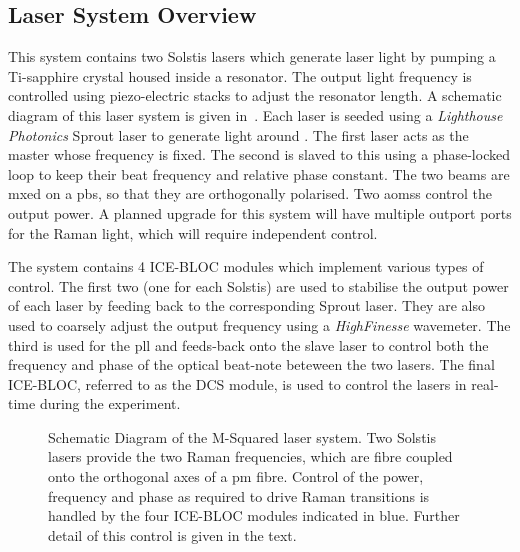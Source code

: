\subsection{Laser System Overview}
\label{subsec:msquared_overview} This system contains two Solstis lasers which
generate laser light by pumping a Ti-sapphire crystal housed inside a resonator.
The output light frequency is controlled using piezo-electric stacks to adjust
the resonator length. A schematic diagram of this laser system is given
in~. Each laser is seeded using a
\textit{Lighthouse Photonics} Sprout laser to generate light around
. The first laser acts as the master whose frequency
is fixed. The second is slaved to this using a phase-locked loop to keep their
beat frequency and relative phase constant. The two beams are mxed on a
\ac{pbs}, so that they are orthogonally polarised. Two \acp{aoms} control the
output power. A planned upgrade for this system will have multiple outport ports
for the Raman light, which will require independent control. \par\noindent The
system contains 4 ICE-BLOC modules which implement various types of control. The
first two (one for each Solstis) are used to stabilise the output power of each
laser by feeding back to the corresponding Sprout laser. They are also used to
coarsely adjust the output frequency using a
\textit{HighFinesse} wavemeter. The third is used for the \ac{pll}
and feeds-back onto the slave laser to control both the frequency and phase of
the optical beat-note beteween the two lasers. The final ICE-BLOC, referred to
as the DCS module, is used to control the lasers in real-time during the
experiment.  \begin{figure}
	\centering \fontsize{10pt}{10pt}
	\resizebox{0.4\textwidth}{!}{}
	\caption[M-Squared Laser System Schematic]{Schematic Diagram of the M-Squared
		laser system. Two Solstis lasers provide the two Raman frequencies, which
		are fibre coupled onto the orthogonal axes of a \ac{pm} fibre. Control of
		the power, frequency and phase as required to drive Raman transitions is
		handled by the four ICE-BLOC modules indicated in blue. Further detail of
		this control is given in the text.} \label{fig:msquared_laser}
\end{figure}

